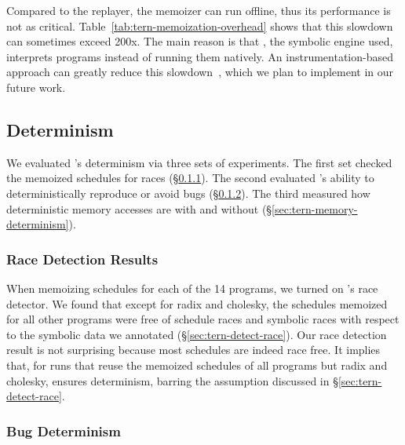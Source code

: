 Compared to the replayer, the memoizer can run offline, thus its
performance is not as critical.  Table~\ref{tab:tern-memoization-overhead}
shows that this slowdown can sometimes exceed 200x.  The main reason
is that \klee, the symbolic engine used, interprets programs instead of
running them natively.  An instrumentation-based approach can greatly
reduce this slowdown~\cite{cadar:exe:ccs06}, which we plan to implement in
our future work.  



\subsection{Determinism}\label{sec:tern-determinism}

We evaluated \tern's determinism via three sets of experiments.  The first
set checked the memoized schedules for races (\S\ref{sec:tern-race-results}).
The second evaluated \tern's ability to deterministically reproduce or avoid
bugs (\S\ref{sec:tern-bug-determinism}).  The third measured how deterministic
memory accesses are with and without
\tern (\S\ref{sec:tern-memory-determinism}).

\subsubsection{Race Detection Results}\label{sec:tern-race-results}

When memoizing schedules for each of the 14 programs, we turned on \tern's
race detector.  We found that except for radix and cholesky, the schedules
\tern memoized for all other programs were free of schedule races and
symbolic races with respect to the symbolic data we annotated
(\S\ref{sec:tern-detect-race}).  Our race detection result is not surprising
because most schedules are indeed race free.  It implies that, for runs
that reuse the memoized schedules of all programs but radix and cholesky,
\tern ensures determinism, barring the assumption discussed in
\S\ref{sec:tern-detect-race}.

\subsubsection{Bug Determinism}\label{sec:tern-bug-determinism}

